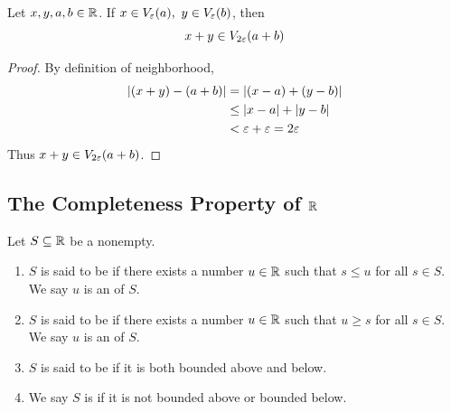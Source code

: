 \documentclass[a4paper,12pt]{article}
\begin{document}
\begin{proposition}
    Let \(x,y,a,b\in\mathbb{R}\). If \(x\in\neighbor{\varepsilon}{a},\ y\in\neighbor{\varepsilon}{b}\), then 
    \[x+y\in V_{2\varepsilon}{(a+b)}\]
    \begin{proof} By definition of neighborhood,
        \begin{align*}
            \left\lvert (x+y)-(a+b)\right\rvert&=\left\lvert (x-a)+(y-b)\right\rvert\\
            &\le\left\lvert x-a\right\rvert+\left\lvert y-b\right\rvert\\
            &<\varepsilon+\varepsilon=2\varepsilon
        \end{align*}
        Thus \(x+y\in V_{2\varepsilon}{(a+b)}\).
    \end{proof}
\end{proposition}

\newpage

\subsection{The Completeness Property of $\mathbb{R}$}

\begin{definition}
    Let \(S\subseteq\mathbb{R}\) be a nonempty.
    \begin{enumerate}
        \item \(S\) is said to be  if there exists a number \(u\in\mathbb{R}\) such that \(s\le u\) for all \(s\in S\). 
        We say \(u\) is an  of \(S\).
        \item \(S\) is said to be  if there exists a number \(u\in\mathbb{R}\) such that \(u\ge s\) for all \(s\in S\). 
        We say \(u\) is an  of \(S\).
        \item \(S\) is said to be  if it is both bounded above and below.
        \item We say \(S\) is  if it is not bounded above or bounded below.\\
    \end{enumerate}
\end{definition}
\end{document}
